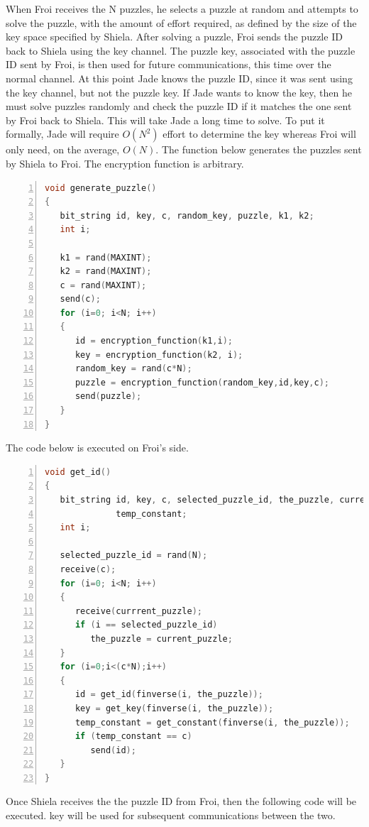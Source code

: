 \documentclass{article}
\begin{document}
When Froi receives the N puzzles, he selects a puzzle at random and
attempts to solve the puzzle, with the amount of effort required,
as defined by the size of the key space specified by Shiela. After
solving a puzzle, Froi sends the puzzle ID back to Shiela using the
key channel. The puzzle key, associated with the puzzle ID sent by
Froi, is then used for future communications, this time over the normal
channel. At this point Jade knows the puzzle ID, since it was sent
using the key channel, but not the puzzle key. If Jade wants to know
the key, then he must solve puzzles randomly and check the puzzle
ID if it matches the one sent by Froi back to Shiela. This will take
Jade a long time to solve. To put it formally, Jade will require $O(N^{2})$
effort to determine the key whereas Froi will only need, on the average,
$O(N)$. The function below generates the puzzles sent by Shiela to
Froi. The encryption function is arbitrary.

\begin{lstlisting}[language=C,numbers=left]
void generate_puzzle()
{
   bit_string id, key, c, random_key, puzzle, k1, k2;
   int i;

   k1 = rand(MAXINT);
   k2 = rand(MAXINT);
   c = rand(MAXINT);
   send(c);
   for (i=0; i<N; i++)
   {
      id = encryption_function(k1,i);
      key = encryption_function(k2, i);
      random_key = rand(c*N);
      puzzle = encryption_function(random_key,id,key,c);
      send(puzzle);
   }
}
\end{lstlisting}


The code below is executed on Froi's side.

\begin{lstlisting}[language=C,numbers=left]
void get_id()
{
   bit_string id, key, c, selected_puzzle_id, the_puzzle, current_puzzle,
              temp_constant;
   int i;
   
   selected_puzzle_id = rand(N);
   receive(c);
   for (i=0; i<N; i++)
   {
      receive(currrent_puzzle);
      if (i == selected_puzzle_id)
         the_puzzle = current_puzzle;
   }
   for (i=0;i<(c*N);i++)
   {
      id = get_id(finverse(i, the_puzzle));  
      key = get_key(finverse(i, the_puzzle));
      temp_constant = get_constant(finverse(i, the_puzzle));
      if (temp_constant == c)
         send(id);
   }
}
\end{lstlisting}


Once Shiela receives the the puzzle ID from Froi, then the following
code will be executed. key will be used for subsequent communications
between the two.
\end{document}
